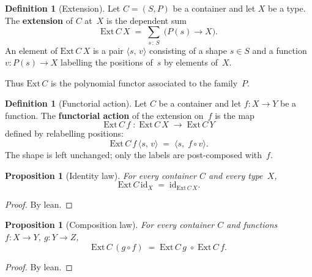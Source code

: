 \documentclass[11pt,a4paper]{article}
\theoremstyle{plain}
\newtheorem{proposition}[theorem]{Proposition}
\theoremstyle{definition}
\newtheorem{definition}[theorem]{Definition}
\newcommand{\Ext}{\mathrm{Ext}}
\newcommand{\id}{\mathrm{id}}
\begin{document}
\begin{definition}[Extension]\label{def:ext}
Let $C = (S,P)$ be a container and let $X$ be a type. The \textbf{extension}
of $C$ at~$X$ is the dependent sum
\begin{equation}
  \Ext\,C\,X \;=\; \sum_{s \,:\, S}\; \bigl(P(s) \to X\bigr).
\end{equation}
An element of $\Ext\,C\,X$ is a pair $\langle s,\, v \rangle$ consisting of a
shape $s \in S$ and a function $v : P(s) \to X$ labelling the positions of~$s$
by elements of~$X$.
\end{definition}

Thus $\Ext\,C$ is the polynomial functor associated to the family~$P$.

\begin{definition}[Functorial action]\label{def:map}
Let $C$ be a container and let $f : X \to Y$ be a function. The
\textbf{functorial action} of the extension on~$f$ is the map
\begin{equation}
  \Ext\,C\,f \;:\; \Ext\,C\,X \;\longrightarrow\; \Ext\,C\,Y
\end{equation}
defined by relabelling positions:
\begin{equation}
  \Ext\,C\,f\,\bigl\langle s,\, v \bigr\rangle
  \;=\;
  \bigl\langle s,\; f \circ v \bigr\rangle.
\end{equation}
The shape is left unchanged; only the labels are post-composed with~$f$.
\end{definition}

\begin{proposition}[Identity law]\label{prop:map-id}
For every container $C$ and every type~$X$,
\begin{equation}
  \Ext\,C\,\id_X \;=\; \id_{\Ext\,C\,X}.
\end{equation}
\end{proposition}

\begin{proof}
By lean.
\end{proof}

\begin{proposition}[Composition law]\label{prop:map-comp}
For every container $C$ and functions $f : X \to Y$, $g : Y \to Z$,
\begin{equation}
  \Ext\,C\,(g \circ f) \;=\; \Ext\,C\,g \;\circ\; \Ext\,C\,f.
\end{equation}
\end{proposition}

\begin{proof}
By lean.
\end{proof}
\end{document}
